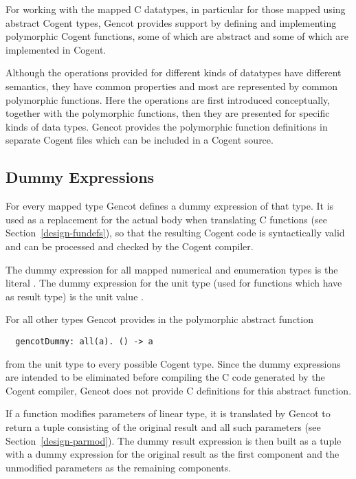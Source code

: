For working with the mapped C datatypes, in particular for those mapped using abstract Cogent types, Gencot provides support by
defining and implementing polymorphic Cogent functions, some of which are abstract and some of which are implemented in Cogent.

Although the operations provided for different kinds of datatypes have different semantics, they have common properties
and most are represented by common polymorphic functions. Here the operations are first introduced conceptually, together with
the polymorphic functions, then they are presented for specific kinds of data types.
Gencot provides the polymorphic function definitions in separate Cogent files which can be
included in a Cogent source.

\subsection{Dummy Expressions}
\label{design-operations-dummy}

For every mapped type Gencot defines a dummy expression of that type. It is used as a replacement for the actual 
body when translating C functions (see Section~\ref{design-fundefs}), so that the resulting Cogent code is 
syntactically valid and can be processed and checked by the Cogent compiler.

The dummy expression for all mapped numerical and enumeration types is the literal .
The dummy expression for the unit type (used for functions which have  as result type) is the 
unit value \code{()}.

For all other types Gencot provides in  the polymorphic abstract function
\begin{verbatim}
  gencotDummy: all(a). () -> a
\end{verbatim}
from the unit type to every possible Cogent type. Since the dummy expressions are intended to be eliminated before compiling the 
C code generated by the Cogent compiler, Gencot does not provide C definitions for this abstract function. 

If a function modifies parameters of linear type, it is translated by Gencot to return a tuple consisting of the 
original result and all such parameters (see Section~\ref{design-parmod}).
The dummy result expression is then built as a tuple with a dummy expression for the original result as the first component 
and the unmodified parameters as the remaining components.

